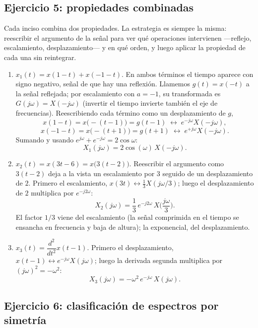 \documentclass[10pt,a4paper]{article}
\begin{document}
	\subsection*{Ejercicio 5: propiedades combinadas}

	Cada inciso combina dos propiedades. La estrategia es siempre la misma: reescribir el argumento de la señal para ver qué operaciones intervienen ---reflejo, escalamiento, desplazamiento--- y en qué orden, y luego aplicar la propiedad de cada una sin reintegrar.

	\begin{enumerate}[label=\textbf{\alph*)}]
		\item $x_1(t) = x(1-t) + x(-1-t)$. En ambos términos el tiempo aparece con signo negativo, señal de que hay una reflexión. Llamemos $g(t)=x(-t)$ a la señal reflejada; por escalamiento con $a=-1$, su transformada es $G(j\omega)=X(-j\omega)$ (invertir el tiempo invierte también el eje de frecuencias). Reescribiendo cada término como un desplazamiento de $g$,
		\[
			x(1-t)=x\big(-(t-1)\big)=g(t-1) \;\leftrightarrow\; e^{-j\omega}X(-j\omega),
		\]
		\[
			x(-1-t)=x\big(-(t+1)\big)=g(t+1) \;\leftrightarrow\; e^{+j\omega}X(-j\omega).
		\]
		Sumando y usando $e^{j\omega}+e^{-j\omega}=2\cos\omega$:
		\[
			\boxed{X_1(j\omega) = 2\cos(\omega)\,X(-j\omega).}
		\]

		\item $x_2(t) = x(3t-6) = x\big(3(t-2)\big)$. Reescribir el argumento como $3(t-2)$ deja a la vista un escalamiento por $3$ seguido de un desplazamiento de $2$. Primero el escalamiento, $x(3t)\leftrightarrow \tfrac{1}{3}X(j\omega/3)$; luego el desplazamiento de $2$ multiplica por $e^{-j2\omega}$:
		\[
			\boxed{X_2(j\omega) = \frac{1}{3}\,e^{-j2\omega}\,X\!\Big(\frac{j\omega}{3}\Big).}
		\]
		El factor $1/3$ viene del escalamiento (la señal comprimida en el tiempo se ensancha en frecuencia y baja de altura); la exponencial, del desplazamiento.

		\item $x_3(t) = \dfrac{d^2}{dt^2}x(t-1)$. Primero el desplazamiento, $x(t-1)\leftrightarrow e^{-j\omega}X(j\omega)$; luego la derivada segunda multiplica por $(j\omega)^2=-\omega^2$:
		\[
			\boxed{X_3(j\omega) = -\omega^2\,e^{-j\omega}\,X(j\omega).}
		\]
	\end{enumerate}

	\subsection*{Ejercicio 6: clasificación de espectros por simetría}
\end{document}
